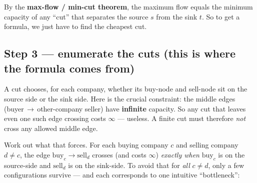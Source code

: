 \begin{center}
\end{center}

By the \textbf{max-flow / min-cut theorem}, the maximum flow equals the minimum
capacity of any ``cut'' that separates the source $s$ from the sink $t$. So to get
a formula, we just have to find the cheapest cut.

\subsection{Step 3 --- enumerate the cuts (this is where the formula comes from)}

A cut chooses, for each company, whether its buy-node and sell-node sit on the
source side or the sink side. Here is the crucial constraint: the middle edges
(buyer\,$\to$\,other-company seller) have \textbf{infinite} capacity. So any cut
that leaves even one such edge crossing costs $\infty$ --- useless. A finite cut
must therefore \emph{not} cross any allowed middle edge.

Work out what that forces. For each buying company $c$ and selling company
$d\neq c$, the edge $\text{buy}_c\!\to\!\text{sell}_d$ crosses (and costs $\infty$)
\emph{exactly when} $\text{buy}_c$ is on the source-side and $\text{sell}_d$ is on
the sink-side. To avoid that for \emph{all} $c\neq d$, only a few configurations
survive --- and each corresponds to one intuitive ``bottleneck'':

